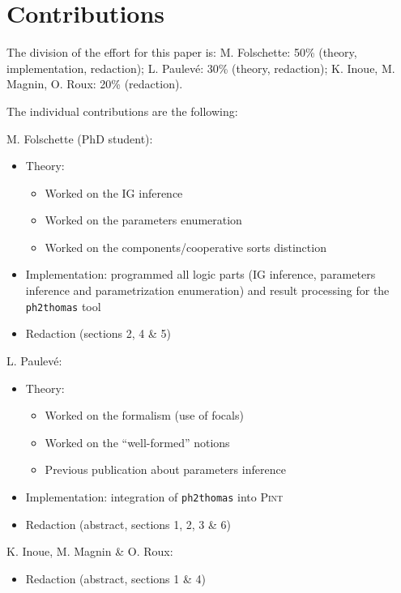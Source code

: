 \appendix
\section*{Contributions}

The division of the effort for this paper is: M. Folschette: 50\% (theory, implementation, redaction); L. Paulev\'e: 30\%
(theory, redaction); K. Inoue, M. Magnin, O. Roux: 20\% (redaction).

\medskip

The individual contributions are the following:

\medskip

\noindent
M. Folschette (PhD student):
\begin{itemize}
  \item Theory:
  \begin{itemize}
    \item Worked on the IG inference
    \item Worked on the parameters enumeration
    \item Worked on the components/cooperative sorts distinction
  \end{itemize}
  \item Implementation: programmed all logic parts (IG inference, parameters inference and parametrization enumeration) and result processing for the \texttt{ph2thomas} tool
  \item Redaction (sections 2, 4 \& 5)
\end{itemize}

\noindent
L. Paulevé:
\begin{itemize}
  \item Theory:
  \begin{itemize}
    \item Worked on the formalism (use of focals)
    \item Worked on the “well-formed” notions
    \item Previous publication about parameters inference
  \end{itemize}
  \item Implementation: integration of \texttt{ph2thomas} into \textsc{Pint}
  \item Redaction (abstract, sections 1, 2, 3 \& 6)
\end{itemize}

\noindent
K. Inoue, M. Magnin \& O. Roux:
\begin{itemize}
  \item Redaction (abstract, sections 1 \& 4)
\end{itemize}
